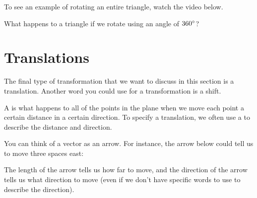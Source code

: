 \documentclass{ximera}
\begin{document}
To see an example of rotating an entire triangle, watch the video below.


\begin{question}
What happens to a triangle if we rotate using an angle of $360\degree$?
\begin{multipleChoice}
\end{multipleChoice}
\end{question}


\section{Translations}
The final type of transformation that we want to discuss in this section is a translation. Another word you could use for a transformation is a shift.
\begin{definition}
A  is what happens to all of the points in the plane when we move each point a certain distance in a certain direction. To specify a translation, we often use a  to describe the distance and direction.
\end{definition}
You can think of a vector as an arrow. For instance, the arrow below could tell us to move three spaces east:
\begin{image}
\end{image}
The length of the arrow tells us how far to move, and the direction of the arrow tells us what direction to move (even if we don't have specific words to use to describe the direction). 
\end{document}

